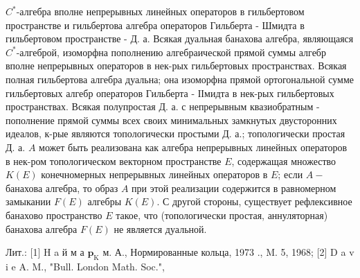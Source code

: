 \documentclass[10pt]{article}
\begin{document}
$C^{*}$-алгебра вполне непрерывных линейных операторов в гильбертовом пространстве и гильбертова алгебра операторов Гильберта - Шмидта в гильбертовом пространстве - Д. а. Всякая дуальная банахова алгебра, являющаяся $C^{*}$-алгеброй, изоморфна пополнению алгебраической прямой суммы алгебр вполне непрерывных операторов в нек-рых гильбертовых пространствах. Всякая полная гильбертова алгебра дуальна; она изоморфна прямой ортогональной сумме гильбертовых алгебр операторов Гильберта - ІІмидта в нек-рых гильбертовых пространствах. Всякая полупростая Д. а. с непрерывным квазиобратным - пополнение прямой суммы всех своих минимальных замкнутых двусторонних идеалов, к-рые являются топологически простыми Д. а.; топологически простая Д. а. $A$ может быть реализована как алгебра непрерывных линейных операторов в нек-ром топологическом векторном пространстве $E$, содержащая множество $K(E)$ конечномерных непрерывных линейных операторов в $E$; если $A-$ банахова алгебра, то образ $A$ при этой реализации содержится в равномерном замыкании $F(E)$ алгебры $K(E)$. С другой стороны, существует рефлексивное банахово пространство $E$ такое, что (топологически простая, аннуляторная) банахова алгебра $F(E)$ не является дуальной.



Лит.: [1] H a й м а $\mathbf{p}_{\mathrm{K}}$ м. А., Нормированные кольца, 1973 ., M. 5, 1968; [2] D a v i e A. M., "Bull. London Math. Soc.",
\end{document}
